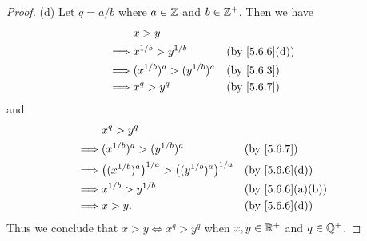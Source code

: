 \begin{proof}{(d)}
  Let \(q = a / b\) where \(a \in \mathbb{Z}\) and \(b \in \mathbb{Z}^+\).
  Then we have
  \begin{align*}
             & x > y                                                          \\
    \implies & x^{1 / b} > y^{1 / b}         &  & \text{(by \cref{5.6.6}(d))} \\
    \implies & (x^{1 / b})^a > (y^{1 / b})^a &  & \text{(by \cref{5.6.3})}    \\
    \implies & x^q > y^q                     &  & \text{(by \cref{5.6.7})}
  \end{align*}
  and
  \begin{align*}
             & x^q > y^q                                                                                             \\
    \implies & (x^{1 / b})^a > (y^{1 / b})^a                                     &  & \text{(by \cref{5.6.7})}       \\
    \implies & \big((x^{1 / b})^a\big)^{1 / a} > \big((y^{1 / b})^a\big)^{1 / a} &  & \text{(by \cref{5.6.6}(d))}    \\
    \implies & x^{1 / b} > y^{1 / b}                                             &  & \text{(by \cref{5.6.6}(a)(b))} \\
    \implies & x > y.                                                            &  & \text{(by \cref{5.6.6}(d))}
  \end{align*}
  Thus we conclude that \(x > y \iff x^q > y^q\) when \(x, y \in \mathbb{R}^+\) and \(q \in \mathbb{Q}^+\).
\end{proof}

